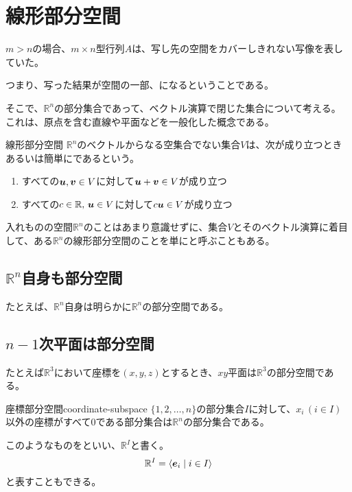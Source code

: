 \documentclass[../../../topic_linear-algebra]{subfiles}
\begin{document}
\sectionline
\section{線形部分空間}

$m > n$の場合、$m \times n$型行列$A$は、写し先の空間をカバーしきれない写像を表していた。

つまり、写った結果が空間の一部、になるということである。

\br

そこで、$\mathbb{R}^n$の部分集合であって、ベクトル演算で閉じた集合について考える。
これは、原点を含む直線や平面などを一般化した概念である。

\begin{definition*}{線形部分空間}
  $\mathbb{R}^n$のベクトルからなる空集合でない集合$V$は、次が成り立つときあるいは簡単にであるという。
  \begin{enumerate}[label=\romanlabel]
    \item すべての$\vb*{u}, \vb*{v} \in V$に対して$\vb*{u} + \vb*{v} \in V$が成り立つ
    \item すべての$c \in \mathbb{R},\,\vb*{u} \in V$に対して$c \vb*{u} \in V$が成り立つ
  \end{enumerate}
\end{definition*}

入れものの空間$\mathbb{R}^n$のことはあまり意識せずに、集合$V$とそのベクトル演算に着目して、ある$\mathbb{R}^n$の線形部分空間のことを単にと呼ぶこともある。

\subsection{$\mathbb{R}^n$自身も部分空間}

たとえば、$\mathbb{R}^n$自身は明らかに$\mathbb{R}^n$の部分空間である。

\subsection{$n-1$次平面は部分空間}

たとえば$\mathbb{R}^3$において座標を$(x, y, z)$とするとき、$xy$平面は$\mathbb{R}^3$の部分空間である。

\begin{definition}{座標部分空間}{coordinate-subspace}
  $\{1, 2, \dots, n\}$の部分集合$I$に対して、$x_i \, (i \in I)$以外の座標がすべて0である部分集合は$\mathbb{R}^n$の部分集合である。

  このようなものをといい、$\mathbb{R}^I$と書く。
  \begin{equation*}
    \mathbb{R}^I = \langle \vb*{e}_i \mid i \in I \rangle
  \end{equation*}
  と表すこともできる。
\end{definition}
\end{document}
